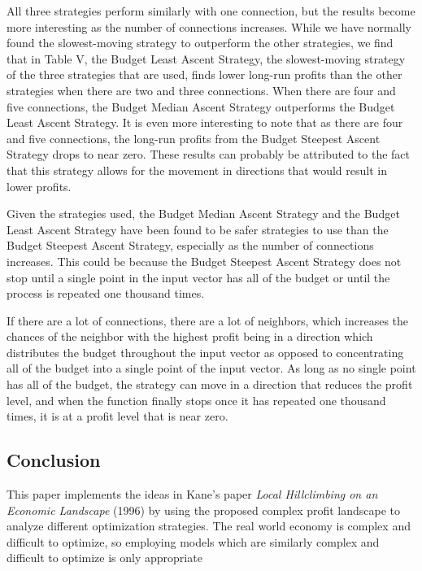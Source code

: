 All three strategies perform similarly with one connection, but the
results become more interesting as the number of connections increases.
While we have normally found the slowest-moving strategy to outperform
the other strategies, we find that in Table V, the Budget Least Ascent
Strategy, the slowest-moving strategy of the three strategies that are
used, finds lower long-run profits than the other strategies when there
are two and three connections. When there are four and five connections,
the Budget Median Ascent Strategy outperforms the Budget Least Ascent
Strategy. It is even more interesting to note that as there are four and
five connections, the long-run profits from the Budget Steepest Ascent
Strategy drops to near zero. These results can probably be attributed to
the fact that this strategy allows for the movement in directions that
would result in lower profits.

Given the strategies used, the Budget Median Ascent Strategy and the
Budget Least Ascent Strategy have been found to be safer strategies to
use than the Budget Steepest Ascent Strategy, especially as the number
of connections increases. This could be because the Budget Steepest
Ascent Strategy does not stop until a single point in the input vector
has all of the budget or until the process is repeated one thousand
times.

If there are a lot of connections, there are a lot of neighbors, which
increases the chances of the neighbor with the highest profit being in a
direction which distributes the budget throughout the input vector as
opposed to concentrating all of the budget into a single point of the
input vector. As long as no single point has all of the budget, the
strategy can move in a direction that reduces the profit level, and when
the function finally stops once it has repeated one thousand times, it
is at a profit level that is near zero.

\subsection{Conclusion}\label{conclusion}

This paper implements the ideas in Kane's paper
\emph{Local Hillclimbing on an Economic Landscape} (1996) by using the
proposed complex profit landscape to analyze different optimization
strategies. The real world economy is complex and difficult to optimize,
so employing models which are similarly complex and difficult to
optimize is only appropriate

